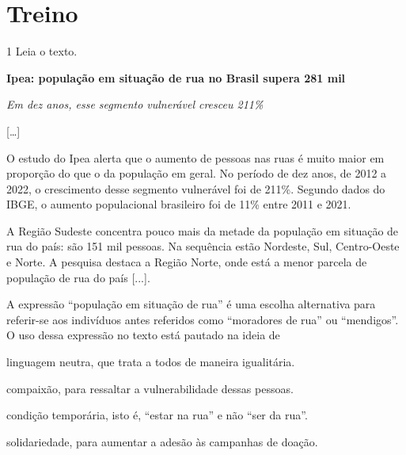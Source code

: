 
\section*{Treino}

\num{1} Leia o texto.

\begin{myquote}
\centering\textbf{Ipea: população em situação de rua no Brasil supera 281 mil}

\centering\emph{Em dez anos, esse segmento vulnerável cresceu 211\%}

{[}\ldots{]}

O estudo do Ipea alerta que o aumento de pessoas nas ruas é muito maior
em proporção do que o da população em geral. No período de dez anos, de
2012 a 2022, o crescimento desse segmento vulnerável foi de 211\%.
Segundo dados do IBGE, o aumento populacional brasileiro foi de 11\%
entre 2011 e 2021.

A Região Sudeste concentra pouco mais da metade da população em situação
de rua do país: são 151 mil pessoas. Na sequência estão Nordeste, Sul,
Centro-Oeste e Norte. A pesquisa destaca a Região Norte, onde está a
menor parcela de população de rua do país {[}...{]}.

\end{myquote}

A expressão ``população em situação de rua'' é uma escolha alternativa
para referir-se aos indivíduos antes referidos como ``moradores de rua''
ou ``mendigos''. O uso dessa expressão no texto está pautado na ideia de

\begin{escolha}

\item linguagem neutra, que trata a todos de maneira igualitária.

\item compaixão, para ressaltar a vulnerabilidade dessas pessoas.

\item condição temporária, isto é, ``estar na rua'' e não ``ser da rua''.

\item solidariedade, para aumentar a adesão às campanhas de doação.

\end{escolha}

